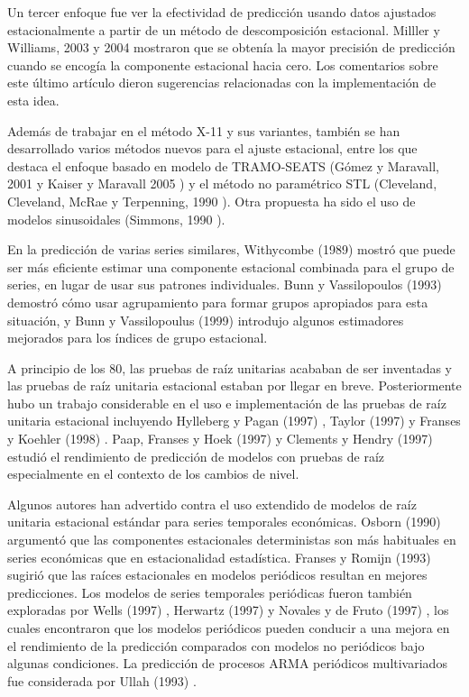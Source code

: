 \documentclass{llncs}
\begin{document}
Un tercer enfoque fue ver la efectividad de predicción usando datos ajustados estacionalmente a partir de un método de descomposición estacional. Milller y Williams, 2003 \cite{Miller2003669} y 2004 \cite{Miller2004529} mostraron que se obtenía la mayor precisión de predicción cuando se encogía la componente estacional hacia cero.  Los comentarios sobre este último artículo dieron sugerencias relacionadas con la implementación de esta idea.

Además de trabajar en el método X-11 y sus variantes, también se han desarrollado varios métodos nuevos para el ajuste estacional, entre los que destaca el enfoque basado en modelo de TRAMO-SEATS (Gómez y Maravall, 2001 \cite{Gomez2001} y Kaiser y Maravall 2005 \cite{Kaiser2005691}) y el método no paramétrico STL (Cleveland, Cleveland, McRae y Terpenning, 1990 \cite{Cleveland19903}). Otra propuesta ha sido el uso de modelos sinusoidales (Simmons, 1990 \cite{Simmons1990485}).

En la predicción de varias series similares, Withycombe (1989) \cite{Withycombe1989547} mostró que puede ser más eficiente estimar una componente estacional combinada para el grupo de series, en lugar de usar sus patrones individuales. Bunn y Vassilopoulos (1993) \cite{Bunn1993517} demostró cómo usar agrupamiento para formar grupos apropiados para esta situación, y Bunn y Vassilopoulus (1999)\cite{Bunn1999431} introdujo algunos estimadores mejorados para los índices de grupo estacional.

A principio de los 80, las pruebas de raíz unitarias acababan de ser inventadas y las pruebas de raíz unitaria estacional estaban por llegar en breve. Posteriormente hubo un trabajo considerable en el uso e implementación de las pruebas de raíz unitaria estacional incluyendo Hylleberg y Pagan (1997) \cite{Hylleberg1997329}, Taylor (1997)\cite{Taylor1997307} y Franses y Koehler (1998) \cite{Franses1998405}. Paap, Franses y Hoek (1997) \cite{Paap1997357} y Clements y Hendry (1997) \cite{Clements1997341} estudió el rendimiento de predicción de modelos con pruebas de raíz especialmente en el contexto de los cambios de nivel.

Algunos autores han advertido contra el uso extendido de modelos de raíz unitaria estacional estándar para series temporales económicas. Osborn (1990) \cite{Osborn1990327} argumentó que las componentes estacionales deterministas son más habituales en series económicas que en estacionalidad estadística. Franses y Romijn (1993) \cite{HansFranses1993467} sugirió que las raíces estacionales en modelos periódicos resultan en mejores predicciones. Los modelos de series temporales periódicas fueron también exploradas por Wells (1997) \cite{Wells1997407}, Herwartz (1997) \cite{Herwartz1997421} y Novales y de Fruto (1997) \cite{Novales1997393}, los cuales encontraron que los modelos periódicos pueden conducir a una mejora en el rendimiento de la predicción comparados con modelos no periódicos bajo algunas condiciones. La predicción de procesos ARMA periódicos multivariados fue considerada por Ullah (1993) \cite{Ula1993645}.
\end{document}
